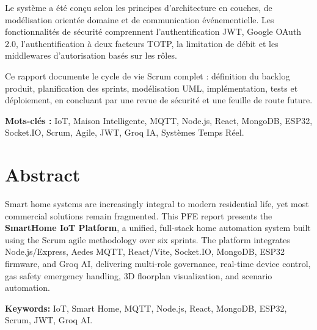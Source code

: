 \documentclass[12pt,a4paper,oneside]{report}
\begin{document}
Le système a été conçu selon les principes d'architecture en couches, de modélisation orientée domaine et de communication événementielle. Les fonctionnalités de sécurité comprennent l'authentification JWT, Google OAuth 2.0, l'authentification à deux facteurs TOTP, la limitation de débit et les middlewares d'autorisation basés sur les rôles.

Ce rapport documente le cycle de vie Scrum complet : définition du backlog produit, planification des sprints, modélisation UML, implémentation, tests et déploiement, en concluant par une revue de sécurité et une feuille de route future.

\textbf{Mots-clés :} IoT, Maison Intelligente, MQTT, Node.js, React, MongoDB, ESP32, Socket.IO, Scrum, Agile, JWT, Groq IA, Systèmes Temps Réel.

\chapter*{Abstract}
Smart home systems are increasingly integral to modern residential life, yet most commercial solutions remain fragmented. This PFE report presents the \textbf{SmartHome IoT Platform}, a unified, full-stack home automation system built using the Scrum agile methodology over six sprints. The platform integrates Node.js/Express, Aedes MQTT, React/Vite, Socket.IO, MongoDB, ESP32 firmware, and Groq AI, delivering multi-role governance, real-time device control, gas safety emergency handling, 3D floorplan visualization, and scenario automation.

\textbf{Keywords:} IoT, Smart Home, MQTT, Node.js, React, MongoDB, ESP32, Scrum, JWT, Groq AI.

\tableofcontents
\listoffigures
\listoftables

\clearpage
{}
\setcounter{page}{1}




















\end{document}
